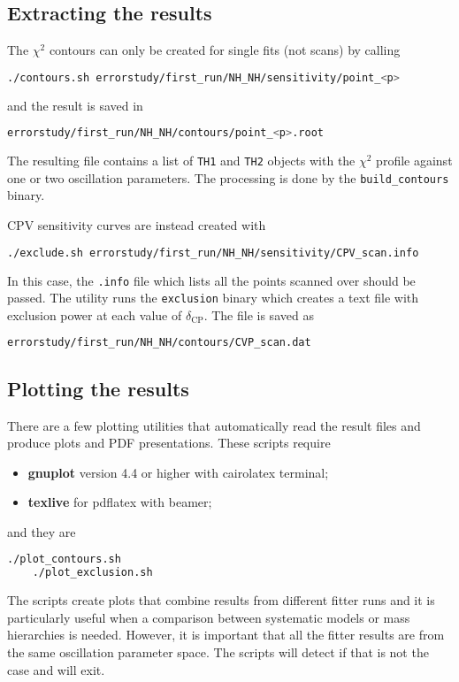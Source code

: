 \documentclass[a4paper, 11pt]{article}
\begin{document}
\subsection{Extracting the results}

The $\chi^2$ contours can only be created for single fits (not scans) by calling
\begin{lstlisting}[language=bash]
	./contours.sh errorstudy/first_run/NH_NH/sensitivity/point_<p>
\end{lstlisting}
and the result is saved in 
\begin{lstlisting}[language=bash]
	errorstudy/first_run/NH_NH/contours/point_<p>.root
\end{lstlisting}
The resulting file contains a list of \texttt{TH1} and \texttt{TH2} objects with the %
$\chi^2$ profile against one or two oscillation parameters.
The processing is done by the \texttt{build\_contours} binary.

CPV sensitivity curves are instead created with
\begin{lstlisting}[language=bash]
	./exclude.sh errorstudy/first_run/NH_NH/sensitivity/CPV_scan.info
\end{lstlisting}
In this case, the \texttt{.info} file which lists all the points scanned over should be passed.
The utility runs the \texttt{exclusion} binary which creates a text file with exclusion power %
at each value of $\delta_\text{CP}$.
The file is saved as
\begin{lstlisting}[language=bash]
	errorstudy/first_run/NH_NH/contours/CVP_scan.dat
\end{lstlisting}

\subsection{Plotting the results}

There are a few plotting utilities that automatically read the result files %
and produce plots and PDF presentations.
These scripts require
\begin{itemize}
		\small
	\item \textbf{gnuplot} version 4.4 or higher with cairolatex terminal;
	\item \textbf{texlive} for pdflatex with beamer;
\end{itemize}
and they are
\begin{lstlisting}[language=bash]
	./plot_contours.sh
	./plot_exclusion.sh
\end{lstlisting}
The scripts create plots that combine results from different fitter runs and it is particularly useful %
when a comparison between systematic models or mass hierarchies is needed.
However, it is important that all the fitter results are from the same oscillation parameter space.
The scripts will detect if that is not the case and will exit.
\end{document}
